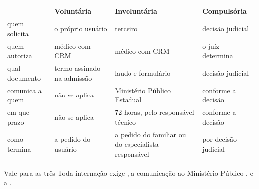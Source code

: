 \begin{frame}{}
\begin{CRtabela}
\scriptsize
\begin{center}
\begin{tabular}{P{2.30cm} P{2.75cm} P{2.90cm} P{2.60cm}}
\toprule
{}
& \textbf{Volunt\'aria} & \textbf{Involunt\'aria} & \textbf{Compuls\'oria} \\
\midrule
quem solicita & o pr\'oprio usu\'ario & terceiro & decis\~ao judicial \\
quem autoriza & m\'edico com CRM & m\'edico com CRM & o ju\'iz determina \\
qual documento & termo assinado na admiss\~ao & laudo e formul\'ario &
decis\~ao judicial \\
comunica a quem & n\~ao se aplica & Minist\'erio P\'ublico Estadual & conforme a
decis\~ao \\
em que prazo & n\~ao se aplica & 72 horas, pelo respons\'avel t\'ecnico &
conforme a decis\~ao \\
como termina & a pedido do usu\'ario & a pedido do familiar ou do especialista
respons\'avel & por decis\~ao judicial \\
\bottomrule
\end{tabular}
\end{center}
\end{CRtabela}

\begin{caixanorma}{Vale para as tr\^es}
Toda interna\c{c}\~ao exige , a
comunica\c{c}\~ao ao Minist\'erio P\'ublico , e a
.
\end{caixanorma}

\end{frame}

